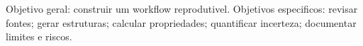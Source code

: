 Objetivo geral: construir um workflow reprodutivel. Objetivos especificos: revisar fontes; gerar estruturas; calcular propriedades; quantificar incerteza; documentar limites e riscos.
